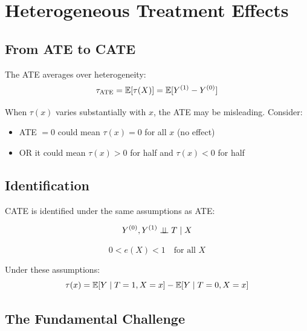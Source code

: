 \section{Heterogeneous Treatment Effects}
\label{sec:hte}

\subsection{From ATE to CATE}

The ATE averages over heterogeneity:
\begin{equation}
\tau_{\text{ATE}} = \mathbb{E}[\tau(X)] = \mathbb{E}[Y^{(1)} - Y^{(0)}]
\end{equation}

When $\tau(x)$ varies substantially with $x$, the ATE may be misleading. Consider:
\begin{itemize}
    \item ATE $= 0$ could mean $\tau(x) = 0$ for all $x$ (no effect)
    \item OR it could mean $\tau(x) > 0$ for half and $\tau(x) < 0$ for half
\end{itemize}

\subsection{Identification}

CATE is identified under the same assumptions as ATE:

\begin{assumption}
\begin{equation}
Y^{(0)}, Y^{(1)} \perp\!\!\!\perp T \mid X
\end{equation}
\end{assumption}

\begin{assumption}[Overlap]
\begin{equation}
0 < e(X) < 1 \quad \text{for all } X
\end{equation}
\end{assumption}

Under these assumptions:
\begin{equation}
\tau(x) = \mathbb{E}[Y \mid T=1, X=x] - \mathbb{E}[Y \mid T=0, X=x]
\end{equation}

\subsection{The Fundamental Challenge}

